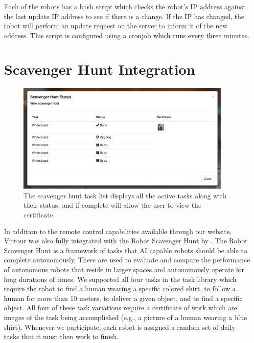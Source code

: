 \documentclass[
  oneside,
  11pt, a4paper,
  footinclude=true,
  headinclude=true,
  cleardoublepage=empty
]{article}
\begin{document}
Each of the robots has a bash script which checks the robot's IP address against the
last update IP address to see if there is a change. If the IP has changed, the robot
will perform an update request on the server to inform it of the new address. This
script is configured using a cronjob which runs every three minutes.

\section{Scavenger Hunt Integration}\label{sec:scav}

\begin{figure}
  \centering
  \includegraphics[width=0.95\textwidth]{scav_certs}
  \caption{The scavenger hunt task list displays all the active tasks along
  with their status, and if complete will allow the user to view the
  certificate}
  \label{fig:scav}
\end{figure}

In addition to the remote control capabilities available through our website,
Virtour was also fully integrated with the Robot Scavenger Hunt
by \citet{zhang2016}.  The Robot Scavenger Hunt is a framework of tasks that AI
capable robots should be able to complete autonomously. These are used to
evaluate and compare the performance of autonomous robots that reside in larger
spaces and autonomously operate for long durations of times. We supported all
four tasks in the task library which require the robot to find a human wearing
a specific colored shirt, to follow a human for more than 10 meters, to deliver
a given object, and to find a specific object. All four of these task
variations require a certificate of work which are images of the task being
accomplished (e.g., a picture of a human wearing a blue shirt). Whenever we
participate, each robot is assigned a random set of daily tasks that it must
then work to finish.
\end{document}
